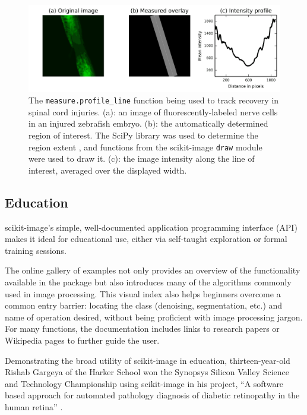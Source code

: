 \documentclass[fleqn,12pt]{wlpeerj}
\begin{document}
\begin{figure}[bht]

    \includegraphics[width=\columnwidth]{fig-lesion_new.png}

    \caption{The \texttt{measure.profile\_line} function being used to track recovery in spinal cord injuries. (a): an image of fluorescently-labeled nerve cells in an injured zebrafish embryo. (b): the automatically determined region of interest. The SciPy library was used to determine the region extent \citep{scipy,scipylib}, and functions from the scikit-image \texttt{draw} module were used to draw it. (c): the image intensity along the line of interest, averaged over the displayed width. \label{fig:profile}}
\end{figure}


\subsection*{Education}
\label{education}

scikit-image's simple, well-documented application programming interface (API) makes it ideal for educational use, either via self-taught exploration or formal training sessions.

The online gallery of examples not only provides an overview of the functionality available in the package but also introduces many of the algorithms commonly used in image processing. This visual index also helps beginners overcome a common entry barrier: locating the class (denoising, segmentation, etc.) and name of operation desired, without being proficient with image processing jargon.  For many functions, the documentation includes links to research papers or Wikipedia pages to further guide the user.

Demonstrating the broad utility of scikit-image in education, thirteen-year-old Rishab Gargeya of the Harker School won the Synopsys Silicon Valley Science and Technology Championship using scikit-image in his project, ``A software based approach for automated pathology diagnosis of diabetic retinopathy in the human retina'' \citep{sciencefair}.
\end{document}
